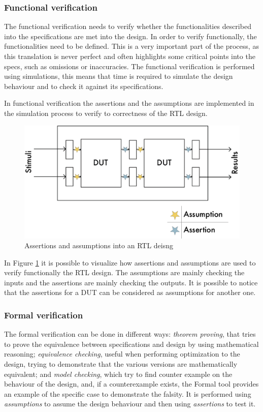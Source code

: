 \subsubsection{Functional verification}
The functional verification needs to verify whether the functionalities described into the specifications are met into the design. In order to verify functionally, the functionalities need to be defined. This is a very important part of the process, as this translation is never perfect and often highlights some critical points into the specs, such as omissions or inaccuracies. The functional verification is performed using simulations, this means that time is required to simulate the design behaviour and to check it against its specifications.

In functional verification the assertions and the assumptions are implemented in the simulation process to verify to correctness of the RTL design.


\begin{figure}[H]
    \centering
    \includegraphics[scale = 0.55]{Chapter_1/img/ass-ass.png}
    \caption{Assertions and assumptions into an RTL deisng}
    \label{ass-ass}
\end{figure}

In Figure \ref{ass-ass} it is possible to visualize how assertions and assumptions are used to verify functionally the RTL design.
The assumptions are mainly checking the inputs and the assertions are mainly checking the outputs. It is possible to notice that the assertions for a DUT can be considered as assumptions for another one.

\subsubsection{Formal verification}
The formal verification can be done in different ways: \textit{theorem proving}, that tries to prove the equivalence between specifications and design by using mathematical reasoning; \textit{equivalence checking}, useful when performing optimization to the design, trying to demonstrate that the various versions are mathematically equivalent; and \textit{model checking}, which try to find counter example on the behaviour of the design, and, if a counterexample exists, the Formal tool provides an example of the specific case to demonstrate the falsity. It is performed using \emph{assumptions} to assume the design behaviour and then using \emph{assertions} to test it.


